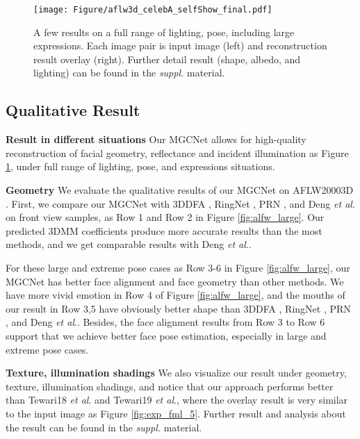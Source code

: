 \documentclass[runningheads]{llncs}
\newcommand{\etal}{\textit{et al}.}
\begin{document}
\begin{figure}[htbp]
	\centering
	\texttt{[image: Figure/aflw3d\_celebA\_selfShow\_final.pdf]}
	\caption{A few results on a full range of lighting, pose, including large expressions. Each image pair is input image (left) and reconstruction result overlay (right). Further detail result (shape, albedo, and lighting) can be found in the \textit{suppl.} material.}
	\label{fig:selfshow_flat}
\end{figure}


\subsection{Qualitative Result}

\textbf{Result in different situations}
Our MGCNet allows for high-quality reconstruction of facial geometry, reflectance and incident illumination as Figure \ref{fig:selfshow_flat}, under full range of lighting, pose, and expressions situations.

\noindent
\textbf{Geometry} We evaluate the qualitative results of our MGCNet on AFLW20003D \cite{dataset_aflw20003D_300WLP_zhu2016face}. 
First, we compare our MGCNet with 3DDFA \cite{dataset_aflw20003D_300WLP_zhu2016face}, RingNet \cite{unsuper_mul_sanyal2019learning_ring}, PRN \cite{super_fit_volu_exp_feng2018joint}, and Deng \etal \cite{unsuper_mul_ng2019accurate} on front view samples, as Row 1 and Row 2 in Figure \ref{fig:alfw_large}.
Our predicted 3DMM coefficients produce more accurate results than the most methods, and we get comparable results with Deng \etal \cite{unsuper_mul_ng2019accurate}. 

For these large and extreme pose cases as Row 3-6 in Figure \ref{fig:alfw_large}, our MGCNet has better face alignment and face geometry than other methods. 
We have more vivid emotion in Row 4 of Figure \ref{fig:alfw_large}, and the mouths of our result in Row 3,5 have obviously better shape than 3DDFA \cite{dataset_aflw20003D_300WLP_zhu2016face}, RingNet \cite{unsuper_mul_sanyal2019learning_ring}, PRN \cite{super_fit_volu_exp_feng2018joint}, and Deng \etal \cite{unsuper_mul_ng2019accurate}. Besides, the face alignment results from Row 3 to Row 6 support that we achieve better face pose estimation, especially in large and extreme pose cases.




\noindent
\textbf{Texture, illumination shadings} We also visualize our result under geometry, texture, illumination shadings, and notice that our approach performs better than Tewari18 \etal \cite{unsuper_tewari2018self} and Tewari19 \etal \cite{unsuper_mul_tewari2019fml}, where the overlay result is very similar to the input image as Figure \ref{fig:exp_fml_5}. 
Further result and analysis about the result can be found in the \textit{suppl.} material.
\end{document}
